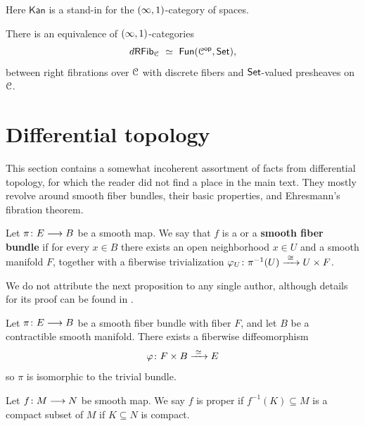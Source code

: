 \documentclass{amsbook}
\begin{document}
\begin{observation}
Here $\mathsf{Kan}$ is a stand-in for the $(\operatorname{\infty},1)$-category of spaces.
\end{observation}

\begin{cor}
 There is an equivalence of $(\operatorname{\infty},1)$-categories 
    \begin{equation}
        d\mathsf{RFib}_{\mathcal C} \,\, \simeq \,\, \operatorname{\sf Fun}(\mathcal C^{\mathsf{op}}, \operatorname{{\mathsf{Set}}}),
    \end{equation}
    between right fibrations over $\mathcal C$ with discrete fibers and $\operatorname{{\mathsf{Set}}}$-valued presheaves on $\mathcal C$.
\end{cor}




\section{Differential topology}

This section contains a somewhat incoherent assortment of facts from differential topology, for which the reader did not find a place in the main text. They mostly revolve around smooth fiber bundles, their basic properties, and Ehresmann's fibration theorem.


\begin{definition}\label{ap:: def: smooth fibration}
    Let $\pi \colon E \longrightarrow B$ be a smooth map. We say that $f$ is a  or a \textbf{smooth fiber bundle} if for every $x\in B$ there exists an open neighborhood $x\in U$ and a smooth manifold $F$, together with a fiberwise trivialization $\varphi_{U}\colon \pi^{-1}(U) \xrightarrow{\,\,\cong \,\,} U \times F$.  
\end{definition}
We do not attribute the next proposition to any single author, although details for its proof can be found in \cite[Corollary~10.3]{Hu94}.
\begin{proposition}\label{ap:: prop: triviality contractibility}
    Let $\pi\colon E \longrightarrow B$ be a smooth fiber bundle with fiber $F$, and let $B$ be a contractible smooth manifold. There exists a fiberwise diffeomorphism \[\varphi \colon F \times B \xrightarrow{\,\, \simeq \,\,} E\] so $\pi$ is isomorphic to the trivial bundle.
\end{proposition}

\begin{definition}\label{ap:: def: proper map}
    Let $f\colon M \longrightarrow N$ be smooth map. We say $f$ is proper if $f^{-1}(K)\subseteq M$ is a compact subset of $M$ if $K\subseteq N$ is compact. 
\end{definition}
\end{document}
